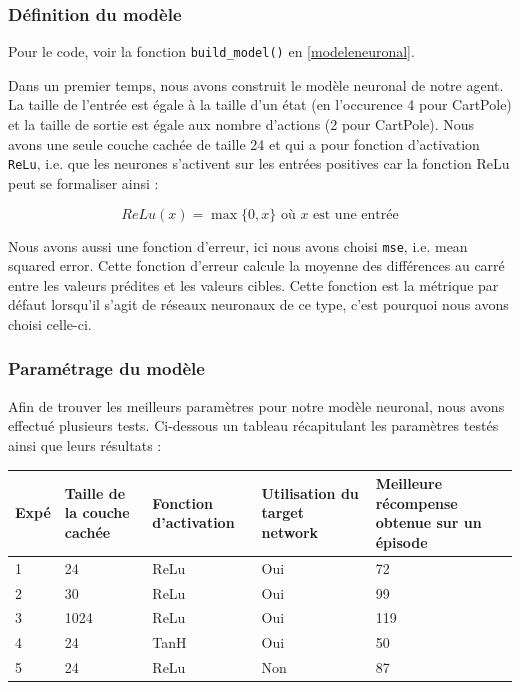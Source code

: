 \documentclass[10pt,a4paper]{article}
\begin{document}
\subsubsection{Définition du modèle}
Pour le code, voir la fonction \lstinline{build_model()} en \ref{modeleneuronal}.

Dans un premier temps, nous avons construit le modèle neuronal de notre agent. La taille de l'entrée est égale à la taille d'un état (en l'occurence 4 pour CartPole) et la taille de sortie est égale aux nombre d'actions (2 pour CartPole). Nous avons une seule couche cachée de taille 24 et qui a pour fonction d'activation \lstinline{ReLu}, i.e. que les neurones s'activent sur les entrées positives car la fonction ReLu peut se formaliser ainsi :

$$ReLu(x) = \max \{0, x\} \text{ où } x \text{ est une entrée}$$

Nous avons aussi une fonction d'erreur, ici nous avons choisi \lstinline{mse}, i.e. mean squared error. Cette fonction d'erreur calcule la moyenne des différences au carré entre les valeurs prédites et les valeurs cibles. Cette fonction est la métrique par défaut lorsqu'il s'agit de réseaux neuronaux de ce type, c'est pourquoi nous avons choisi celle-ci.

\subsubsection{Paramétrage du modèle}

Afin de trouver les meilleurs paramètres pour notre modèle neuronal, nous avons effectué plusieurs tests. Ci-dessous un tableau récapitulant les paramètres testés ainsi que leurs résultats :
\begin{table}[!h]
\begin{tabular}{|p{0.7cm}|p{2.3cm}|p{2.3cm}|p{2.3cm}|p{2.3cm}|}
\hline
Expé & Taille de la couche cachée & Fonction d'activation & Utilisation du target network & Meilleure récompense obtenue sur un épisode \\ \hline
1    & 24                         & ReLu                  & Oui                           & 72                                          \\ \hline
2    & 30                         & ReLu                  & Oui                           & 99                                          \\ \hline
3    & 1024                       & ReLu                  & Oui                           & 119                                         \\ \hline
4    & 24                         & TanH                  & Oui                           & 50                                          \\ \hline
5    & 24                         & ReLu                  & Non                           & 87                                          \\ \hline
\end{tabular}
\end{table}
\end{document}
